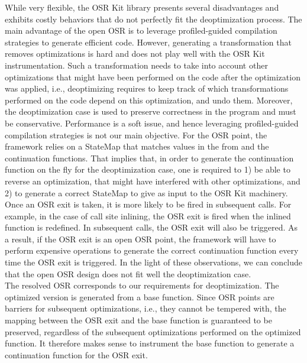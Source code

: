 While very flexible, the OSR Kit\cite{OSRKit} library presents several disadvantages and exhibits costly behaviors that do not perfectly fit the deoptimization process.
The main advantage of the open OSR is to leverage profiled-guided compilation strategies to generate efficient code.
However, generating a transformation that removes optimizations is hard and does not play well with the OSR Kit instrumentation.
Such a transformation needs to take into account other optimizations that might have been performed on the code after the optimization was applied, i.e., deoptimizing requires to keep track of which transformations performed on the code depend on this optimization, and undo them.
Moreover, the deoptimization case is used to preserve correctness in the program and must be conservative. 
Performance is a soft issue, and hence leveraging profiled-guided compilation strategies is not our main objective. 
For the OSR point, the framework relies on a StateMap that matches values in the from and the continuation functions.
That implies that, in order to generate the continuation function on the fly for the deoptimization case, one is required to 1) be able to reverse an optimization, that might have interfered with other optimizations, and 2) to generate a correct StateMap to give as input to the OSR Kit machinery.\\

Once an OSR exit is taken, it is more likely to be fired in subsequent calls.
For example, in the case of call site inlining, the OSR exit is fired when the inlined function is redefined.
In subsequent calls, the OSR exit will also be triggered.
As a result, if the OSR exit is an open OSR point, the framework will have to perform expensive operations to generate the correct continuation function every time the OSR exit is triggered.
In the light of these observations, we can conclude that the open OSR design does not fit well the deoptimization case.\\

The resolved OSR corresponds to our requirements for deoptimization.
The optimized version is generated from a base function.
Since OSR points are barriers for subsequent optimizations, i.e., they cannot be tempered with, the mapping between the OSR exit and the base function is guaranteed to be preserved, regardless of the subsequent optimizations performed on the optimized function.
It therefore makes sense to instrument the base function to generate a continuation function for the OSR exit.\\

